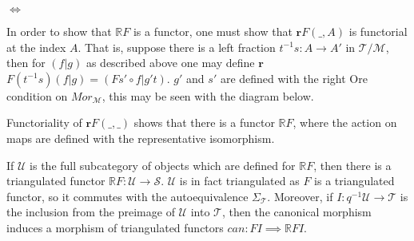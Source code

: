         \begin{center}
             $\iff$
        \end{center}

        In order to show that $\mathbb{R}F$ is a functor, one must show that $\textbf{r}$$F(\_,A)$ is functorial at the index $A$. That is, suppose there is a left fraction $t^{-1}s:A\rightarrow A'$ in $\mathcal{T}/\mathcal{M}$, then for $(f|g)$ as described above one may define $\textbf{r}$$F(t^{-1}s)(f|g)=(Fs'\circ f|g't)$. $g'$ and $s'$ are defined with the right Ore condition on $Mor_{\mathcal{M}}$, this may be seen with the diagram below.

        \begin{center}
        \end{center}

        Functoriality of $\textbf{r}$$F(\_,\_)$ shows that there is a functor $\mathbb{R}F$, where the action on maps are defined with the representative isomorphism.
        
        \begin{center}
        \end{center}
        
        If $\mathcal{U}$ is the full subcategory of objects which are defined for $\mathbb{R}F$, then there is a triangulated functor $\mathbb{R}F:\mathcal{U}\rightarrow \mathcal{S}$. $\mathcal{U}$ is in fact triangulated as $F$ is a triangulated functor, so it commutes with the autoequivalence $\Sigma_{\mathcal{T}}$. Moreover, if $I:q^{-1}\mathcal{U}\rightarrow \mathcal{T}$ is the inclusion from the preimage of $\mathcal{U}$ into $\mathcal{T}$, then the canonical morphism induces a morphism of triangulated functors $can:FI\implies\mathbb{R}FI$. \\

